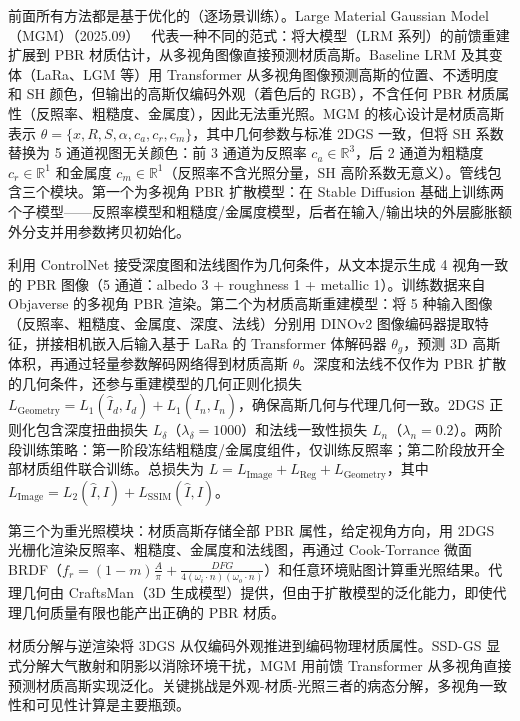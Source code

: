 前面所有方法都是基于优化的（逐场景训练）。Large Material Gaussian Model（MGM）（2025.09）~\cite{2509_22112} 代表一种不同的范式：将大模型（LRM 系列）的前馈重建扩展到 PBR 材质估计，从多视角图像直接预测材质高斯。Baseline LRM 及其变体（LaRa、LGM 等）用 Transformer 从多视角图像预测高斯的位置、不透明度和 SH 颜色，但输出的高斯仅编码外观（着色后的 RGB），不含任何 PBR 材质属性（反照率、粗糙度、金属度），因此无法重光照。MGM 的核心设计是材质高斯表示 $\theta = \{x, R, S, \alpha, c_a, c_r, c_m\}$，其中几何参数与标准 2DGS 一致，但将 SH 系数替换为 5 通道视图无关颜色：前 3 通道为反照率 $c_a \in \mathbb{R}^3$，后 2 通道为粗糙度 $c_r \in \mathbb{R}^1$ 和金属度 $c_m \in \mathbb{R}^1$（反照率不含光照分量，SH 高阶系数无意义）。管线包含三个模块。第一个为多视角 PBR 扩散模型：在 Stable Diffusion 基础上训练两个子模型——反照率模型和粗糙度/金属度模型，后者在输入/输出块的外层膨胀额外分支并用参数拷贝初始化。

利用 ControlNet 接受深度图和法线图作为几何条件，从文本提示生成 4 视角一致的 PBR 图像（5 通道：albedo 3 + roughness 1 + metallic 1）。训练数据来自 Objaverse 的多视角 PBR 渲染。第二个为材质高斯重建模型：将 5 种输入图像（反照率、粗糙度、金属度、深度、法线）分别用 DINOv2 图像编码器提取特征，拼接相机嵌入后输入基于 LaRa 的 Transformer 体解码器 $\theta_g$，预测 3D 高斯体积，再通过轻量参数解码网络得到材质高斯 $\theta$。深度和法线不仅作为 PBR 扩散的几何条件，还参与重建模型的几何正则化损失 $L_{\text{Geometry}} = L_1(\hat{I}_d, I_d) + L_1(\hat{I}_n, I_n)$，确保高斯几何与代理几何一致。2DGS 正则化包含深度扭曲损失 $L_\delta$（$\lambda_\delta = 1000$）和法线一致性损失 $L_n$（$\lambda_n = 0.2$）。两阶段训练策略：第一阶段冻结粗糙度/金属度组件，仅训练反照率；第二阶段放开全部材质组件联合训练。总损失为 $L = L_{\text{Image}} + L_{\text{Reg}} + L_{\text{Geometry}}$，其中 $L_{\text{Image}} = L_2(\hat{I}, I) + L_{\text{SSIM}}(\hat{I}, I)$。

第三个为重光照模块：材质高斯存储全部 PBR 属性，给定视角方向，用 2DGS 光栅化渲染反照率、粗糙度、金属度和法线图，再通过 Cook-Torrance 微面 BRDF（$f_r = (1-m)\frac{A}{\pi} + \frac{DFG}{4(\omega_i \cdot n)(\omega_o \cdot n)}$）和任意环境贴图计算重光照结果。代理几何由 CraftsMan（3D 生成模型）提供，但由于扩散模型的泛化能力，即使代理几何质量有限也能产出正确的 PBR 材质。

\begin{takeaway}
材质分解与逆渲染将 3DGS 从仅编码外观推进到编码物理材质属性。SSD-GS 显式分解大气散射和阴影以消除环境干扰，MGM 用前馈 Transformer 从多视角直接预测材质高斯实现泛化。关键挑战是外观-材质-光照三者的病态分解，多视角一致性和可见性计算是主要瓶颈。
\end{takeaway}

